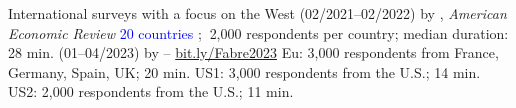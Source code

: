 \documentclass[aspectratio=169,xcolor=dvipsnames, 11pt,mathserif]{beamer}
\begin{document}
\begin{frame}{International surveys with a focus on the West\label{support_more} \hyperlink{support}{}}
    \bbvs
    \ip {}  (02/2021--02/2022) by , \textit{American Economic Review}
    \bbvs \ip \textcolor{blue}{20 countries}%
    ; $~$2,000 respondents per country; median duration: 28 min. \ee
    \ip {} (01--04/2023) by  -- \href{https://bit.ly/Fabre2023}{bit.ly/Fabre2023}
    \bbvs \ip Eu: 3,000 respondents from France, Germany, Spain, UK; 20 min. 
    \ip US1: 3,000 respondents from the U.S.; 14 min. 
    \ip US2: 2,000 respondents from the U.S.; 11 min.
    \ee 
    \ee \vspace*{-.2cm}
\end{frame}
\end{document}
